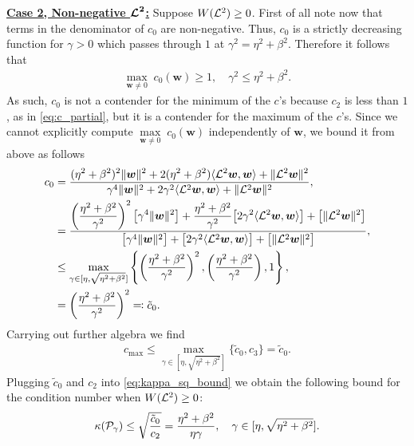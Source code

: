 \documentclass[a4paper,10pt]{article}
\begin{document}
\underline{\textbf{Case 2, Non-negative $\bm{{\cal L}^2}$\textbf{:}}} Suppose $W({\cal L}^2) \geq 0$. First of all note now that terms in the denominator of $c_0$ are non-negative. Thus, $c_0$ is a strictly decreasing function for $\gamma > 0$ which passes through $1$ at $\gamma^2 = \eta^2 + \beta^2$. Therefore it follows that
\begin{align*}
\underset{\bm{w} \neq 0}{\max} \; c_0(\bm{w}) \geq 1, \quad \gamma^2 \leq \eta^2 + \beta^2.
\end{align*}
As such, $c_0$ is not a contender for the minimum of the $c$'s because $c_2$ is less than $1$, as in \eqref{eq:c_partial}, but it is a contender for the maximum of the $c$'s. Since we cannot explicitly compute $\underset{\bm{w} \neq 0}{\max} \; c_0(\bm{w})$ independently of $\bm{w}$, we bound it from above as follows
\begin{align*}
c_0 &= 
\frac{
\displaystyle{
(\eta^2 + \beta^2})^2 \Vert \bm{w} \Vert^2 
+
2(\eta^2 + \beta^2) \langle {\cal L}^2 \bm{w}, \bm{w} \rangle 
+ \Vert {\cal L}^2 \bm{w} \Vert^2
}
{
\gamma^4 \Vert \bm{w} \Vert^2 + 2 \gamma^2 \langle {\cal L}^2 \bm{w}, \bm{w} \rangle + \Vert {\cal L}^2 \bm{w} \Vert^2
},\\
&=
\frac{
\displaystyle{
\left(\frac{\eta^2 + \beta^2}{\gamma^2}\right)^2 \big[ \gamma^4 \Vert \bm{w} \Vert^2 \big]
+
\frac{\eta^2 + \beta^2}{\gamma^2} \big[ 2 \gamma^2 \langle {\cal L}^2 \bm{w}, \bm{w} \rangle \big]
+ \big[\Vert {\cal L}^2 \bm{w} \Vert^2\big]
}
}
{
\big[\gamma^4 \Vert \bm{w} \Vert^2\big] + \big[ 2 \gamma^2 \langle {\cal L}^2 \bm{w}, \bm{w} \rangle \big] + \big[\Vert {\cal L}^2 \bm{w} \Vert^2\big]
},
\\
&\leq
\underset{\gamma \in [\eta , \sqrt{\eta^2 + \beta^2}]}{\max} \left\{ \left(\frac{\eta^2 + \beta^2}{\gamma^2}\right)^2,
\left(\frac{\eta^2 + \beta^2}{\gamma^2}\right),
1 \right\},\\
&= \left(\frac{\eta^2 + \beta^2}{\gamma^2}\right)^2 \eqqcolon \tilde{c}_0.
\end{align*} 
Carrying out further algebra we find
\begin{align}
c_{\max} \leq \underset{\gamma \in [\eta , \sqrt{\eta^2 + \beta^2}]}{\max} \{ \tilde{c}_0, c_3\} = \tilde{c}_0.
\end{align}
Plugging $\tilde{c}_0$ and $c_2$ into \eqref{eq:kappa_sq_bound} we obtain the following bound for the condition number when $W({\cal L}^2) \geq 0$:
\begin{align}
\label{eq:kappa_part1}
\kappa({\cal P}_{\gamma}) \leq \sqrt{\frac{\tilde{c}_0}{c_2}} = \frac{\eta^2 + \beta^2}{\eta \gamma}, \quad \gamma \in [\eta, \sqrt{\eta^2 + \beta^2}].
\end{align}
\end{document}
